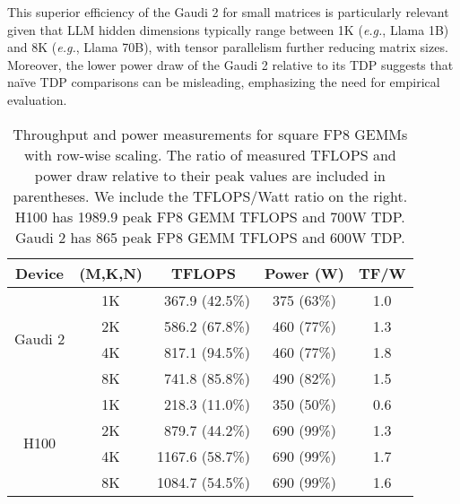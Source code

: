 This superior efficiency of the Gaudi 2 for small matrices is particularly relevant given that LLM hidden dimensions typically range between 1K (\textit{e.g.}, Llama 1B) and 8K (\textit{e.g.}, Llama 70B), with tensor parallelism further reducing matrix sizes. Moreover, the lower power draw of the Gaudi 2 relative to its TDP suggests that naïve TDP comparisons can be misleading, emphasizing the need for empirical evaluation.

\begin{table}
\small
\centering
\caption{Throughput and power measurements for square FP8 GEMMs with row-wise scaling. The ratio of measured TFLOPS and power draw relative to their peak values are included in parentheses. We include the TFLOPS/Watt ratio on the right. H100 has 1989.9 peak FP8 GEMM TFLOPS and 700W TDP. Gaudi 2 has 865 peak FP8 GEMM TFLOPS and 600W TDP.}
\vskip 0.15in
\begin{tabular}{@{}ccrcc@{}}
\toprule
Device & (M,K,N) & \multicolumn{1}{c}{TFLOPS} & \multicolumn{1}{r}{Power (W)} & TF/W \\ \midrule
\multirow{4}{*}{Gaudi 2} & 1K & 367.9  (42.5\%) & 375 (63\%) & 1.0 \\
                         & 2K & 586.2  (67.8\%) & 460 (77\%) & 1.3 \\
                         & 4K & 817.1  (94.5\%) & 460 (77\%) & 1.8 \\
                         & 8K & 741.8  (85.8\%) & 490 (82\%) & 1.5 \\ \midrule
\multirow{4}{*}{H100}    & 1K & 218.3  (11.0\%) & 350 (50\%) & 0.6 \\
                         & 2K & 879.7  (44.2\%) & 690 (99\%) & 1.3 \\
                         & 4K & 1167.6 (58.7\%) & 690 (99\%) & 1.7 \\
                         & 8K & 1084.7 (54.5\%) & 690 (99\%) & 1.6 \\ \bottomrule
\end{tabular}
\vskip -0.1in
\label{tab:gemm_tflops_power}
\end{table}
